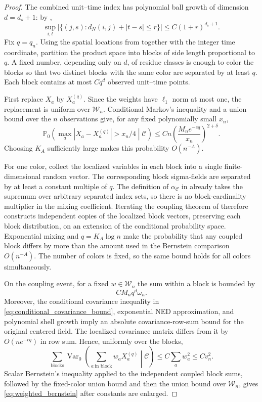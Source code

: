 \documentclass[11pt]{article}
\numberwithin{equation}{section}
\theoremstyle{remark}
\newcommand{\Pzero}{\mathbb P_0}
\begin{document}
\begin{proof}
The combined unit--time index has polynomial ball growth of dimension $d=d_s+1$: by ,
\[
\sup_{i,t}
\left|
\{(j,s):d_N(i,j)+|t-s|\le r\}
\right|
\le
C(1+r)^{d_s+1}.
\]
Fix $q=q_n$. Using the spatial locations from  together with the integer time coordinate, partition the product space into blocks of side length proportional to $q$. A fixed number, depending only on $d$, of residue classes is enough to color the blocks so that two distinct blocks with the same color are separated by at least $q$. Each block contains at most $Cq^d$ observed unit--time points.

First replace $X_a$ by $X_a^{(q)}$. Since the weights have $\ell_1$ norm at most one, the replacement is uniform over $\mathcal W_n$. Conditional Markov's inequality and a union bound over the $n$ observations give, for any fixed polynomially small $x_n$,
\[
\Pzero\!\left(
\max_a|X_a-X_a^{(q)}|>x_n/4
\middle|\mathscr C
\right)
\le
Cn\left(\frac{M_ne^{-cq}}{x_n}\right)^{2+\delta}.
\]
Choosing $K_A$ sufficiently large makes this probability $O(n^{-A})$.

For one color, collect the localized variables in each block into a single finite-dimensional random vector. The corresponding block sigma-fields are separated by at least a constant multiple of $q$. The definition of $\alpha_{\mathscr C}$ in  already takes the supremum over arbitrary separated index sets, so there is no block-cardinality multiplier in the mixing coefficient. Iterating the coupling theorem of \citet{bradley1983} therefore constructs independent copies of the localized block vectors, preserving each block distribution, on an extension of the conditional probability space. Exponential mixing and $q=K_A\log n$ make the probability that any coupled block differs by more than the amount used in the Bernstein comparison $O(n^{-A})$. The number of colors is fixed, so the same bound holds for all colors simultaneously.

On the coupling event, for a fixed $w\in\mathcal W_n$ the sum within a block is bounded by
\[
CM_nq^d\omega_n.
\]
Moreover, the conditional covariance inequality in \eqref{eq:conditional_covariance_bound}, exponential NED approximation, and polynomial shell growth imply an absolute covariance-row-sum bound for the original centered field. The localized covariance matrix differs from it by $O(ne^{-cq})$ in row sum. Hence, uniformly over the blocks,
\[
\sum_{\text{blocks}}
\operatorname{Var}_0\!\left(
\sum_{a\ \text{in block}}w_aX_a^{(q)}
\middle|\mathscr C
\right)
\le
C\sum_aw_a^2
\le Cv_n^2.
\]
Scalar Bernstein's inequality applied to the independent coupled block sums, followed by the fixed-color union bound and then the union bound over $\mathcal W_n$, gives \eqref{eq:weighted_bernstein} after constants are enlarged.


\end{proof}
\end{document}
